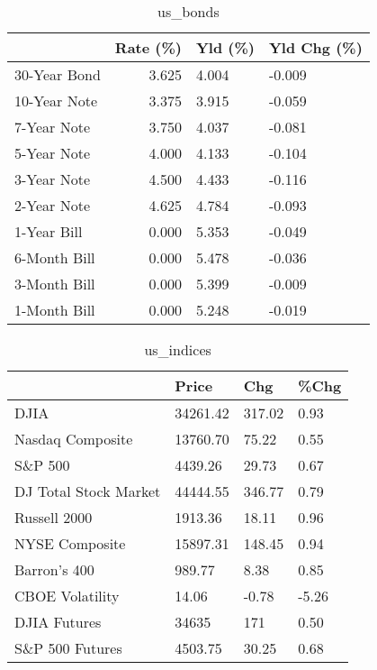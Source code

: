 \documentclass{article}%
\begin{document}
%


\begin{table}[htbp]%
\caption{us\_bonds}%
\centering%
\begin{adjustbox}{width=1\textwidth}%
\begin{tabular}{lrll}
\toprule
             &  Rate (\%) & Yld (\%) & Yld Chg (\%) \\
\midrule
30-Year Bond &     3.625 &   4.004 &      -0.009 \\
10-Year Note &     3.375 &   3.915 &      -0.059 \\
 7-Year Note &     3.750 &   4.037 &      -0.081 \\
 5-Year Note &     4.000 &   4.133 &      -0.104 \\
 3-Year Note &     4.500 &   4.433 &      -0.116 \\
 2-Year Note &     4.625 &   4.784 &      -0.093 \\
 1-Year Bill &     0.000 &   5.353 &      -0.049 \\
6-Month Bill &     0.000 &   5.478 &      -0.036 \\
3-Month Bill &     0.000 &   5.399 &      -0.009 \\
1-Month Bill &     0.000 &   5.248 &      -0.019 \\
\bottomrule
\end{tabular}
%
\end{adjustbox}%
\end{table}

%


\begin{table}[htbp]%
\caption{us\_indices}%
\centering%
\begin{adjustbox}{width=1\textwidth}%
\begin{tabular}{llll}
\toprule
                      &    Price &    Chg &  \%Chg \\
\midrule
                 DJIA & 34261.42 & 317.02 &  0.93 \\
     Nasdaq Composite & 13760.70 &  75.22 &  0.55 \\
              S\&P 500 &  4439.26 &  29.73 &  0.67 \\
DJ Total Stock Market & 44444.55 & 346.77 &  0.79 \\
         Russell 2000 &  1913.36 &  18.11 &  0.96 \\
       NYSE Composite & 15897.31 & 148.45 &  0.94 \\
         Barron's 400 &   989.77 &   8.38 &  0.85 \\
      CBOE Volatility &    14.06 &  -0.78 & -5.26 \\
         DJIA Futures &    34635 &    171 &  0.50 \\
      S\&P 500 Futures &  4503.75 &  30.25 &  0.68 \\
\bottomrule
\end{tabular}
%
\end{adjustbox}%
\end{table}
\end{document}
